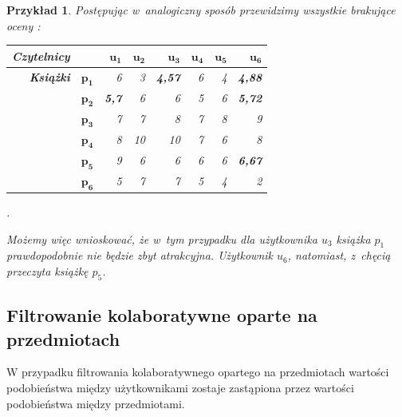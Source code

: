 \documentclass[12pt,a4paper]{report}
\newtheorem{przyklad}{Przykład}[chapter]{\normalfont}
\begin{document}
\begin{przyklad}
Postępując w~analogiczny sposób przewidzimy wszystkie brakujące oceny :
\begin{center}
\begin{tabular}{|r|r|r|r|r|r|r|r|} \hline
\textbf{Czytelnicy} & & $\mathbf{u_1}$ & $\mathbf{u_2}$ & $\mathbf{u_3}$ & $\mathbf{u_4}$ & $\mathbf{u_5}$ & $\mathbf{u_6}$ \\
\hline
\hline
\textbf{Książki} &$\mathbf{p_1}$ & 6 & 3 & \textbf{4,57} & 6 & 4 & \textbf{4,88} \\
\hline
&$\mathbf{p_2}$ & \textbf{5,7} & 6 & 6 & 5 & 6 & \textbf{5,72} \\
\hline
&$\mathbf{p_3}$ & 7 & 7 & 8 & 7 & 8 & 9 \\
\hline
&$\mathbf{p_4}$ & 8 & 10 & 10 & 7 & 6 & 8 \\
\hline
&$\mathbf{p_5}$ & 9 & 6 & 6 & 6 & 6 & \textbf{6,67}  \\
\hline
&$\mathbf{p_6}$ & 5 & 7 & 7 & 5 & 4 & 2 \\
\hline
\end{tabular}.
\end{center}
Możemy więc wnioskować, że w~tym przypadku dla użytkownika $u_3$ książka $p_1$ prawdopodobnie nie będzie zbyt atrakcyjna. Użytkownik $u_6$, natomiast, z~chęcią przeczyta książkę $p_5$. 
\end{przyklad}

\subsection{Filtrowanie kolaboratywne oparte na  przedmiotach}
W przypadku filtrowania kolaboratywnego opartego na przedmiotach wartości podobieństwa między użytkownikami zostaje zastąpiona przez wartości podobieństwa między przedmiotami.
\end{document}
